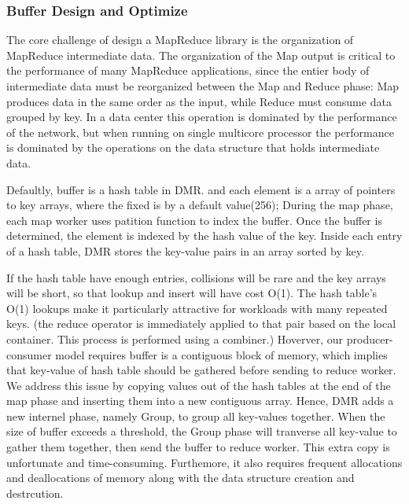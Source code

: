 \subsubsection{Buffer Design and Optimize}
The core challenge of design a MapReduce library 
is the organization of MapReduce
intermediate data.
The organization of the Map output is critical to the
performance of many MapReduce applications, 
since the entier body of intermediate data must be
reorganized between the Map and Reduce phase:
Map produces data in the same order as the input,
while Reduce must consume data grouped by key.\cite{mao2010metis}
In a data center this operation is dominated by
the performance of the network, but when running 
on single multicore processor the performance
is dominated by the operations on the data structure
that holds intermediate data.


Defaultly, buffer is a hash table in DMR.
and each element is a array of pointers to key arrays,
where the fixed is by a default value(256);
During the map phase, each map worker uses patition function
to index the buffer.
Once the buffer is determined, 
the element is indexed by the hash value of the key.
Inside each entry of a hash table,
DMR stores the key-value pairs in an array sorted by key.

If the hash table have enough entries, 
collisions will be rare and the key arrays will be short,
so that lookup and insert will have cost O(1).
The hash table's O(1) lookups make it
particularly attractive for workloads with many repeated keys.
{\color{gray}(the reduce operator is immediately applied
to that pair based on the local container. This process is
performed using a combiner.)}
Hoverver, our producer-consumer model requires
buffer is a contiguous block of memory, 
which implies that key-value of hash table should be gathered
before sending to reduce worker.
We address this issue by copying values out of the hash tables
at the end of the map phase and inserting them into a new contiguous array.
Hence, DMR adds a new internel phase, namely Group,
to group all key-values together.
When the size of buffer exceeds a threshold,
the Group phase will tranverse all key-value to gather them together,
then send the buffer to reduce worker.
This extra copy is unfortunate and time-consuming.
Furthemore, it also requires frequent allocations
and deallocations of memory 
along with the data structure creation and destrcution.

